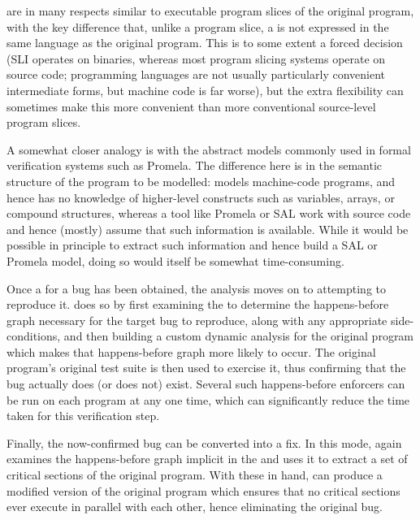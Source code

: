\STateMachines are in many respects similar to executable program
slices of the original program, with the key difference that, unlike a
program slice, a \StateMachine is not expressed in the same language
as the original program.  This is to some extent a forced decision
(SLI operates on binaries, whereas most program slicing systems
operate on source code; programming languages are not usually
particularly convenient intermediate forms, but machine code is far
worse), but the extra flexibility can sometimes make this more
convenient than more conventional source-level program
slices.

A somewhat closer analogy is with the abstract models commonly used in
formal verification systems such as Promela\needCite{}.  The
difference here is in the semantic structure of the program to be
modelled: \technique{} models machine-code programs, and hence has no
knowledge of higher-level constructs such as variables, arrays, or
compound structures, whereas a tool like Promela or SAL\needCite{}
work with source code and hence (mostly) assume that such information
is available.  While it would be possible in principle to extract such
information and hence build a SAL or Promela model, doing so would
itself be somewhat time-consuming.

Once a {\StateMachine} for a bug has been obtained, the analysis moves
on to attempting to reproduce it.  {\Technique} does so by first
examining the {\StateMachine} to determine the happens-before graph
necessary for the target bug to reproduce, along with any appropriate
side-conditions, and then building a custom dynamic analysis for the
original program which makes that happens-before graph more likely to
occur.  The original program's original test suite is then used to
exercise it, thus confirming that the bug actually does (or does not)
exist.  Several such happens-before enforcers can be run on each
program at any one time, which can significantly reduce the time taken
for this verification step.

Finally, the now-confirmed bug can be converted into a fix.  In this
mode, {\technique} again examines the happens-before graph implicit in
the {\StateMachine} and uses it to extract a set of critical sections
of the original program.  With these in hand, {\technique} can produce
a modified version of the original program which ensures that no
critical sections ever execute in parallel with each other, hence
eliminating the original bug.

